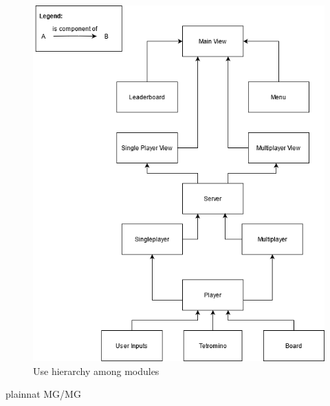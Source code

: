 \documentclass[12pt, titlepage]{article}
\begin{document}
\begin{figure}[H]
\centering
\includegraphics[width=1\textwidth]{MG/diagram.png} 

\caption{Use hierarchy among modules}
\label{FigUH}
\end{figure}


 {plainnat}
 {MG/MG}
\end{document}
